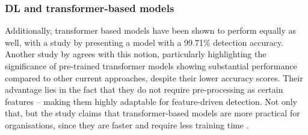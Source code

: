 
\subsubsection*{DL and transformer-based models}
Additionally, transformer based models have been shown to perform equally as well, with a study by \cite{do2024integrated} presenting a model with a 99.71\% detection accuracy. Another study by \cite{shirazi2022towards} agrees with this notion, particularly highlighting the significance of pre-trained transformer models showing substantial performance compared to other current approaches, despite their lower accuracy scores. Their advantage lies in the fact that they do not require pre-processing as certain features -- making them highly adaptable for feature-driven detection. Not only that, but the study claims that transformer-based models are more practical for organisations, since they are faster and require less training time \citep{shirazi2022towards}.
